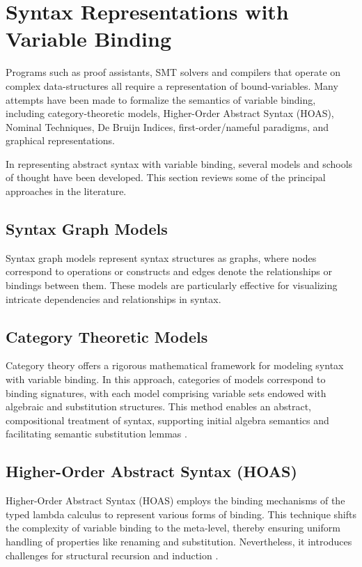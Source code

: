 \documentclass{article}
\begin{document}
\section{Syntax Representations with Variable Binding}
Programs such as proof assistants, SMT solvers and compilers that operate on
complex data-structures all require a representation of bound-variables. Many
attempts have been made to formalize the semantics of variable binding,
including category-theoretic models, Higher-Order Abstract Syntax (HOAS),
Nominal Techniques, De Bruijn Indices, first-order/nameful paradigms, and
graphical representations. 

In representing abstract syntax with variable binding, several models and
schools of thought have been developed. This section reviews some of the
principal approaches in the literature.

\subsection{Syntax Graph Models}
Syntax graph models represent syntax structures as graphs, where nodes
correspond to operations or constructs and edges denote the relationships or
bindings between them. These models are particularly effective for visualizing
intricate dependencies and relationships in syntax.

\subsection{Category Theoretic Models}
Category theory offers a rigorous mathematical framework for modeling syntax
with variable binding. In this approach, categories of models correspond to
binding signatures, with each model comprising variable sets endowed with
algebraic and substitution structures. This method enables an abstract,
compositional treatment of syntax, supporting initial algebra semantics and
facilitating semantic substitution lemmas \cite{fiore99cat}.

\subsection{Higher-Order Abstract Syntax (HOAS)}
Higher-Order Abstract Syntax (HOAS) employs the binding mechanisms of the typed
lambda calculus to represent various forms of binding. This technique shifts the
complexity of variable binding to the meta-level, thereby ensuring uniform
handling of properties like renaming and substitution. Nevertheless, it
introduces challenges for structural recursion and induction \cite{gabby02hoas}.
\end{document}
